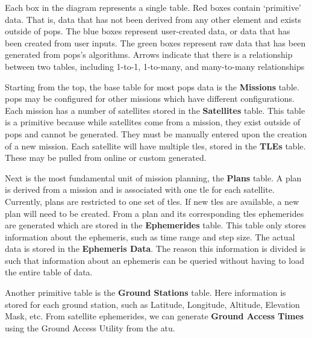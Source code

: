 Each box in the diagram represents a single table. Red boxes contain
`primitive' data. That is, data that has not been derived from any other
element and exists outside of \gls{pops}. The blue boxes represent user-created
data, or data that has been created from user inputs. The green boxes represent
raw data that has been generated from \gls{pops}'s algorithms. Arrows indicate
that there is a relationship between two tables, including 1-to-1, 1-to-many,
and many-to-many relationships

Starting from the top, the base table for most \gls{pops} data is the
\textbf{Missions} table. \gls{pops} may be configured for other missions which
have different configurations. Each mission has a number of satellites stored
in the \textbf{Satellites} table. This table is a primitive because while
satellites come from a mission, they exist outside of \gls{pops} and cannot be
generated. They must be manually entered upon the creation of a new mission.
Each satellite will have multiple \glspl{tle}, stored in the \textbf{TLEs}
table. These may be pulled from online or custom generated.

Next is the most fundamental unit of mission planning, the \textbf{Plans}
table. A plan is derived from a mission and is associated with one \gls{tle}
for each satellite. Currently, plans are restricted to one set of \glspl{tle}.
If new \glspl{tle} are available, a new plan will need to be created.  From a
plan and its corresponding \glspl{tle} ephemerides are generated which are
stored in the \textbf{Ephemerides} table. This table only stores information
about the ephemeris, such as time range and step size. The actual data is
stored in the \textbf{Ephemeris Data}. The reason this information is divided
is such that information about an ephemeris can be queried without having to
load the entire table of data.

Another primitive table is the \textbf{Ground Stations} table. Here information
is stored for each ground station, such as Latitude, Longitude, Altitude,
Elevation Mask, etc. From satellite ephemerides, we can generate \textbf{Ground
Access Times} using the Ground Access Utility from the \gls{atu}.

